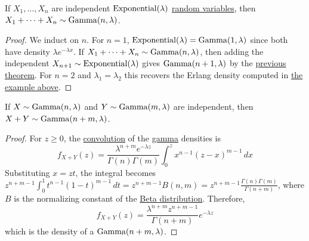   \begin{theorem}
    \label{thm:sum-of-independent-exponentials-is-gamma}
    If $X_1, \ldots, X_n$ are independent $\operatorname{Exponential}(\lambda)$ \hyperref[def:exponential-random-variable]{random variables}, then $X_1 + \cdots + X_n \sim \operatorname{Gamma}(n, \lambda)$. 
  \end{theorem}
  \begin{proof}
    We induct on $n$. For $n = 1$, $\operatorname{Exponential}(\lambda) = \operatorname{Gamma}(1, \lambda)$ since both have density $\lambda e^{-\lambda x}$. If $X_1 + \cdots + X_n \sim \operatorname{Gamma}(n, \lambda)$, then adding the independent $X_{n+1} \sim \operatorname{Exponential}(\lambda)$ gives $\operatorname{Gamma}(n+1, \lambda)$ by the \hyperref[thm:sum-of-independent-gamma-and-exponential-is-gamma]{previous theorem}. For $n = 2$ and $\lambda_1 = \lambda_2$ this recovers the Erlang density computed in \hyperref[ex:sum-of-two-independent-exponentials]{the example above}. 
  \end{proof}

  \begin{theorem}
    \label{thm:sum-of-independent-gammas-is-gamma}
    If $X \sim \operatorname{Gamma}(n, \lambda)$ and $Y \sim \operatorname{Gamma}(m, \lambda)$ are independent, then $X + Y \sim \operatorname{Gamma}(n + m, \lambda)$. 
  \end{theorem}
  \begin{proof}
    For $z \geq 0$, the \hyperref[def:convolution]{convolution} of the \hyperref[def:gamma-random-variable]{gamma} densities is 
    \begin{equation}
      f_{X+Y} (z) = \frac{\lambda^{n+m} e^{-\lambda z}}{\Gamma(n) \Gamma(m)} \int_0^z x^{n-1} (z - x)^{m-1} \,dx
    \end{equation}
    Substituting $x = z t$, the integral becomes $z^{n+m-1} \int_0^1 t^{n-1} (1 - t)^{m-1} \,dt = z^{n+m-1} B(n, m) = z^{n+m-1} \frac{\Gamma(n) \Gamma(m)}{\Gamma(n + m)}$, where $B$ is the normalizing constant of the \hyperref[def:beta-random-variable]{Beta distribution}. Therefore, 
    \begin{equation}
      f_{X+Y} (z) = \frac{\lambda^{n+m} z^{n+m-1}}{\Gamma(n + m)} e^{-\lambda z}
    \end{equation}
    which is the density of a $\operatorname{Gamma}(n + m, \lambda)$. 
  \end{proof}

